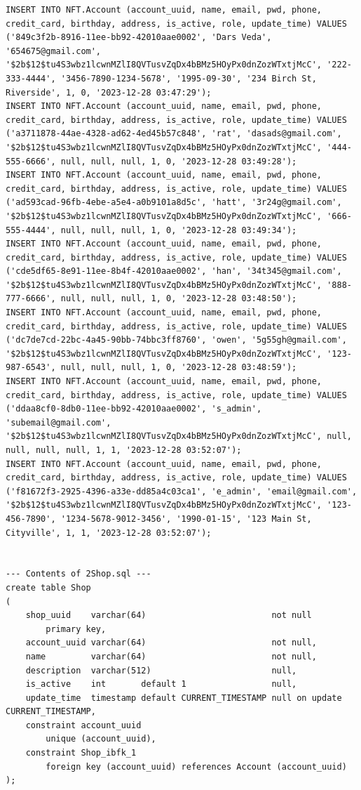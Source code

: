 \documentclass[a4paper, 12pt]{article}
\begin{document}
\begin{lstlisting}
INSERT INTO NFT.Account (account_uuid, name, email, pwd, phone, credit_card, birthday, address, is_active, role, update_time) VALUES ('849c3f2b-8916-11ee-bb92-42010aae0002', 'Dars Veda', '654675@gmail.com', '$2b$12$tu4S3wbz1lcwnMZlI8QVTusvZqDx4bBMz5HOyPx0dnZozWTxtjMcC', '222-333-4444', '3456-7890-1234-5678', '1995-09-30', '234 Birch St, Riverside', 1, 0, '2023-12-28 03:47:29');
INSERT INTO NFT.Account (account_uuid, name, email, pwd, phone, credit_card, birthday, address, is_active, role, update_time) VALUES ('a3711878-44ae-4328-ad62-4ed45b57c848', 'rat', 'dasads@gmail.com', '$2b$12$tu4S3wbz1lcwnMZlI8QVTusvZqDx4bBMz5HOyPx0dnZozWTxtjMcC', '444-555-6666', null, null, null, 1, 0, '2023-12-28 03:49:28');
INSERT INTO NFT.Account (account_uuid, name, email, pwd, phone, credit_card, birthday, address, is_active, role, update_time) VALUES ('ad593cad-96fb-4ebe-a5e4-a0b9101a8d5c', 'hatt', '3r24g@gmail.com', '$2b$12$tu4S3wbz1lcwnMZlI8QVTusvZqDx4bBMz5HOyPx0dnZozWTxtjMcC', '666-555-4444', null, null, null, 1, 0, '2023-12-28 03:49:34');
INSERT INTO NFT.Account (account_uuid, name, email, pwd, phone, credit_card, birthday, address, is_active, role, update_time) VALUES ('cde5df65-8e91-11ee-8b4f-42010aae0002', 'han', '34t345@gmail.com', '$2b$12$tu4S3wbz1lcwnMZlI8QVTusvZqDx4bBMz5HOyPx0dnZozWTxtjMcC', '888-777-6666', null, null, null, 1, 0, '2023-12-28 03:48:50');
INSERT INTO NFT.Account (account_uuid, name, email, pwd, phone, credit_card, birthday, address, is_active, role, update_time) VALUES ('dc7de7cd-22bc-4a45-90bb-74bbc3ff8760', 'owen', '5g55gh@gmail.com', '$2b$12$tu4S3wbz1lcwnMZlI8QVTusvZqDx4bBMz5HOyPx0dnZozWTxtjMcC', '123-987-6543', null, null, null, 1, 0, '2023-12-28 03:48:59');
INSERT INTO NFT.Account (account_uuid, name, email, pwd, phone, credit_card, birthday, address, is_active, role, update_time) VALUES ('ddaa8cf0-8db0-11ee-bb92-42010aae0002', 's_admin', 'subemail@gmail.com', '$2b$12$tu4S3wbz1lcwnMZlI8QVTusvZqDx4bBMz5HOyPx0dnZozWTxtjMcC', null, null, null, null, 1, 1, '2023-12-28 03:52:07');
INSERT INTO NFT.Account (account_uuid, name, email, pwd, phone, credit_card, birthday, address, is_active, role, update_time) VALUES ('f81672f3-2925-4396-a33e-dd85a4c03ca1', 'e_admin', 'email@gmail.com', '$2b$12$tu4S3wbz1lcwnMZlI8QVTusvZqDx4bBMz5HOyPx0dnZozWTxtjMcC', '123-456-7890', '1234-5678-9012-3456', '1990-01-15', '123 Main St, Cityville', 1, 1, '2023-12-28 03:52:07');


--- Contents of 2Shop.sql ---
create table Shop
(
    shop_uuid    varchar(64)                         not null
        primary key,
    account_uuid varchar(64)                         not null,
    name         varchar(64)                         not null,
    description  varchar(512)                        null,
    is_active    int       default 1                 null,
    update_time  timestamp default CURRENT_TIMESTAMP null on update CURRENT_TIMESTAMP,
    constraint account_uuid
        unique (account_uuid),
    constraint Shop_ibfk_1
        foreign key (account_uuid) references Account (account_uuid)
);


\end{lstlisting}
\end{document}
